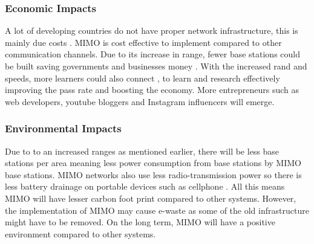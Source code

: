\documentclass[11pt]{report}
\begin{document}
\begin{appendices}
	\subsubsection*{Economic Impacts}
	A lot of developing countries do not have proper network infrastructure, this is mainly due costs \cite{acm}. MIMO is cost effective to implement compared to other communication channels. Due to its increase in range, fewer base stations could be built saving governments and businesses money \cite{50}. With the increased rand and speeds, more learners could also connect , to learn and research effectively improving the pass rate and boosting the economy. More entrepreneurs such as web developers, youtube bloggers and Instagram influencers will emerge. 
	
	
	\subsubsection*{Environmental Impacts}
	Due to to an increased ranges as mentioned earlier, there will be less base stations per area meaning less power consumption from base stations by MIMO base stations. MIMO networks also use less radio-transmission power so there is less battery drainage on portable devices such as cellphone \cite{50}. All this means MIMO will have lesser carbon foot print compared to other systems. However, the implementation of MIMO may cause e-waste as some of the old infrastructure might have to be removed. On the long term, MIMO will have a positive environment compared to other systems.
	
	\end{appendices}
\end{document}

